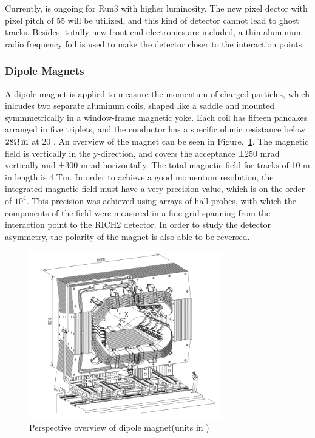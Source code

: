 Currently, 
\lhcb \upgradeone is ongoing for Run3 with higher luminosity.
The new pixel dector with pixel pitch of 55 \mum  will be utilized,
and this kind of detector cannot lead to ghost tracks.
Besides,
totally new front-end electronics are included,
a thin aluminium radio frequency foil is used to make the detector closer to the interaction points\supercite{Svihra:2727215}.


\subsubsection{Dipole Magnets}


A dipole magnet is applied to measure the momentum of charged particles,
which inlcudes two separate aluminum coils, 
shaped like a saddle and mounted symmmetrically in a window-frame magnetic yoke. 
Each coil has fifteen pancakes arranged in five triplets,
and the conductor has a specific ohmic resistance below $28 \Omega\dot{\text{\,m}}$ at 20 \degc.
An overview of the magnet can be seen in Figure.~\ref{fig:MAG}.
The magnetic field is vertically in the y-direction, 
and covers the acceptance ±250 mrad vertically and ±300 mrad horizontally. 
The total magnetic field for tracks of 10 m in length is 4 Tm. 
In order to achieve a good momentum resolution, 
the integrated magnetic field must have a very precision value, 
which is on the order of $10^{4}$. 
This precision was achieved using arrays of hall probes, 
with which the components of the field were measured in a fine grid spanning from the interaction point to the RICH2 detector. 
In order to study the detector asymmetry,   
the polarity of the magnet is also able to be reversed. 


\begin{figure}[!hbtp]
\centering
\includegraphics[width=0.75\textwidth]{Figures/02_Detector/MAG}%
	\caption{ Perspective overview of dipole magnet(units in \mm)\supercite{LHCb-DP-2008-001}}
\label{fig:MAG}
\end{figure}



